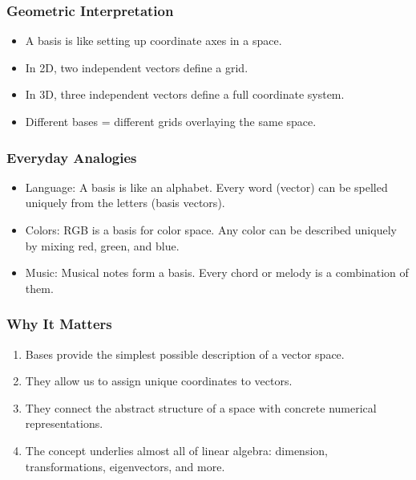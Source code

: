 \documentclass[
  letterpaper,
  DIV=11,
  numbers=noendperiod]{scrreprt}
\providecommand{\tightlist}{%
  \setlength{\itemsep}{0pt}\setlength{\parskip}{0pt}}
\begin{document}
\subsubsection{Geometric
Interpretation}\label{geometric-interpretation-5}

\begin{itemize}
\tightlist
\item
  A basis is like setting up coordinate axes in a space.
\item
  In 2D, two independent vectors define a grid.
\item
  In 3D, three independent vectors define a full coordinate system.
\item
  Different bases = different grids overlaying the same space.
\end{itemize}

\subsubsection{Everyday Analogies}\label{everyday-analogies-31}

\begin{itemize}
\tightlist
\item
  Language: A basis is like an alphabet. Every word (vector) can be
  spelled uniquely from the letters (basis vectors).
\item
  Colors: RGB is a basis for color space. Any color can be described
  uniquely by mixing red, green, and blue.
\item
  Music: Musical notes form a basis. Every chord or melody is a
  combination of them.
\end{itemize}

\subsubsection{Why It Matters}\label{why-it-matters-31}

\begin{enumerate}
\def\labelenumi{\arabic{enumi}.}
\tightlist
\item
  Bases provide the simplest possible description of a vector space.
\item
  They allow us to assign unique coordinates to vectors.
\item
  They connect the abstract structure of a space with concrete numerical
  representations.
\item
  The concept underlies almost all of linear algebra: dimension,
  transformations, eigenvectors, and more.
\end{enumerate}
\end{document}
